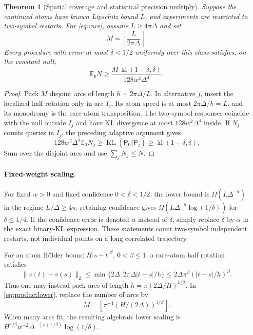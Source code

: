 \documentclass[11pt]{article}
\newtheorem{theorem}{Theorem}[section]
\theoremstyle{remark}\newtheorem{remark}[theorem]{Remark}
\newcommand{\KL}{\operatorname{KL}}
\newcommand{\kl}{\operatorname{kl}}
\begin{document}
\begin{theorem}[Spatial coverage and statistical precision multiply]\label{thm:spatialstat}
Suppose the continued atoms have known Lipschitz bound $L$, and experiments are restricted to two-symbol restarts. For \eqref{eq:rare}, assume $L\geq4\pi\Delta$ and set
\[
 M=\left\lfloor\frac{L}{2\pi\Delta}\right\rfloor.
\]
Every procedure with error at most $\delta<1/2$ uniformly over this class satisfies, on the constant null,
\begin{equation}\label{eq:productlower}
 \mathbb E_0N\geq
 \frac{M\,\kl(1-\delta,\delta)}{128w^2\Delta^4}.
\end{equation}
\end{theorem}
\begin{proof}
Pack $M$ disjoint arcs of length $h=2\pi\Delta/L$. In alternative $j$, insert the localized half rotation only in arc $I_j$. Its atom speed is at most $2\pi\Delta/h=L$, and its monodromy is the rare-atom transposition. The two-symbol responses coincide with the null outside $I_j$ and have KL divergence at most $128w^2\Delta^4$ inside. If $N_j$ counts queries in $I_j$, the preceding adaptive argument gives
\[
 128w^2\Delta^4\mathbb E_0N_j
 \geq\KL(\mathsf P_0\Vert\mathsf P_j)
 \geq\kl(1-\delta,\delta).
\]
Sum over the disjoint arcs and use $\sum_jN_j\leq N$.
\end{proof}
\paragraph{Fixed-weight scaling.}
For fixed $w>0$ and fixed confidence $0<\delta<1/2$, the lower bound is $\Omega(L\Delta^{-5})$ in the regime $L/\Delta\geq4\pi$; retaining confidence gives $\Omega(L\Delta^{-5}\log(1/\delta))$ for $\delta\leq1/4$. If the confidence error is denoted $\alpha$ instead of $\delta$, simply replace $\delta$ by $\alpha$ in the exact binary-KL expression. These statements count two-symbol independent restarts, not individual points on a long correlated trajectory.

For an atom H\"older bound $H|s-t|^\beta$, $0<\beta\leq1$, a rare-atom half rotation satisfies
\[
 \|v(t)-v(s)\|_2\leq
 \min\{2\Delta,2\pi\Delta|t-s|/h\}
 \leq2\Delta\pi^\beta(|t-s|/h)^\beta.
\]
Thus one may instead pack arcs of length $h=\pi(2\Delta/H)^{1/\beta}$. In \eqref{eq:productlower}, replace the number of arcs by
\[
 M=\left\lfloor\pi^{-1}(H/(2\Delta))^{1/\beta}\right\rfloor.
\]
When many arcs fit, the resulting algebraic lower scaling is
$H^{1/\beta}w^{-2}\Delta^{-(4+1/\beta)}\log(1/\delta)$.
\end{document}
